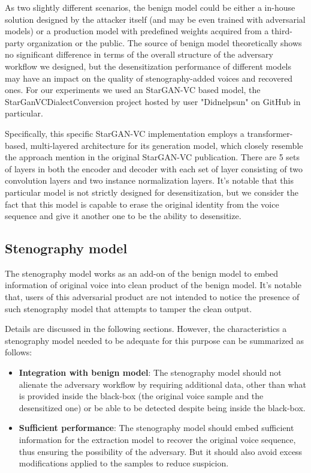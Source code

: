 \documentclass[journal]{IEEEtran} %
\begin{document}
\begin{CJK*}{UTF8}{gbsn}
As two slightly different scenarios, the benign model could be either a in-house solution designed by the attacker itself (and may be even trained with adversarial models) or a production model with predefined weights acquired from a third-party organization or the public. The source of benign model theoretically shows no significant difference in terms of the overall structure of the adversary workflow we designed, but the desensitization performance of different models may have an impact on the quality of stenography-added voices and recovered ones. For our experiments we used an StarGAN-VC\cite{a3} based model, the StarGanVCDialectConversion project hosted by user "Didnelpsun" on GitHub\cite{a2} in particular.

Specifically, this specific StarGAN-VC implementation employs a transformer-based, multi-layered architecture for its generation model, which closely resemble the approach mention in the original StarGAN-VC publication. There are 5 sets of layers in both the encoder and decoder with each set of layer consisting of two convolution layers and two instance normalization layers. It's notable that this particular model is not strictly designed for desensitization, but we consider the fact that this model is capable to erase the original identity from the voice sequence and give it another one to be the ability to desensitize.

\subsection{Stenography model}

The stenography model works as an add-on of the benign model to embed information of original voice into clean product of the benign model. It's notable that, users of this adversarial product are not intended to notice the presence of such stenography model that attempts to tamper the clean output.

Details are discussed in the following sections. However, the characteristics a stenography model needed to be adequate for this purpose can be summarized as follows:

\begin{itemize}
    \item \textbf{Integration with benign model}: The stenography model should not alienate the adversary workflow by requiring additional data, other than what is provided inside the black-box (the original voice sample and the desensitized one) or be able to be detected despite being inside the black-box.
    \item \textbf{Sufficient performance}: The stenography model should embed sufficient information for the extraction model to recover the original voice sequence, thus ensuring the possibility of the adversary. But it should also avoid excess modifications applied to the samples to reduce suspicion.
\end{itemize}


\end{CJK*}
\end{document}
